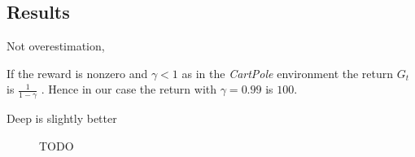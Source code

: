 \subsection{Results}


Not overestimation, 

If the reward is nonzero and $\gamma < 1$ as in the \textit{CartPole} environment the return $G_t$ is $\frac{1}{1 - \gamma}$ \cite{Sutton:1998:IRL:551283}. Hence in our case the return with $\gamma = 0.99$ is $100$.


Deep is slightly better

% 


\begin{figure*}[t]
	\centering
	
	\caption{TODO}
	\label{fig:subfig}
\end{figure*}